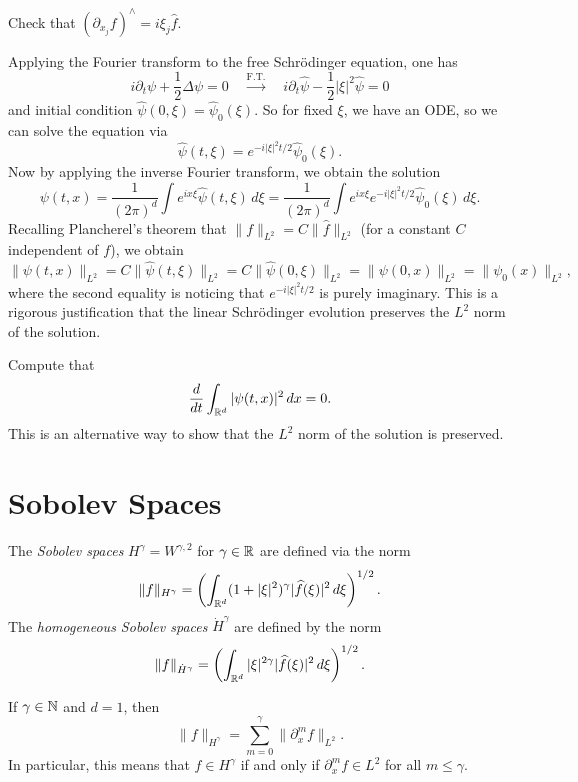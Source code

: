 \begin{exercise}
  Check that $(\partial_{x_j} f)^\wedge = i \xi_j \widehat{f}$.
\end{exercise}

Applying the Fourier transform to the free Schr\"odinger
equation, one has
\[
  i \partial_t \psi + \frac{1}{2} \Delta \psi = 0 \quad
  \xrightarrow{\text{F.T.}} \quad
  i \partial_t \widehat{\psi} - \frac{1}{2} |\xi|^2 \widehat{\psi} = 0
\]
and initial condition $\widehat{\psi}(0, \xi) = \widehat{\psi}_0(\xi)$.
So for fixed $\xi$, we have an ODE, so we
can solve the equation via
\[
  \widehat{\psi}(t, \xi) =
  e^{-i |\xi|^2 t / 2} \widehat{\psi}_0(\xi).
\]
Now by applying the inverse Fourier transform, we obtain
the solution
\[
  \psi(t, x) = \frac{1}{(2\pi)^d} \int e^{ix\xi} \widehat{\psi}(t, \xi)\, d\xi
  = \frac{1}{(2\pi)^d} \int e^{ix\xi} e^{-i |\xi|^2 t / 2} \widehat{\psi}_0(\xi)\, d\xi.
\]
Recalling Plancherel's theorem that
$\|f\|_{L^2} = C\|\widehat{f}\|_{L^2}$ (for a constant
$C$ independent of $f$), we obtain
\[
  \|\psi(t, x)\|_{L^2}
  = C\|\widehat{\psi}(t, \xi)\|_{L^2}
  = C\|\widehat{\psi}(0, \xi)\|_{L^2}
  = \|\psi(0, x)\|_{L^2}
  = \|\psi_0(x)\|_{L^2},
\]
where the second equality is noticing that
$e^{-i |\xi|^2 t / 2}$ is purely imaginary. This is
a rigorous justification that the linear Schr\"odinger
evolution preserves the $L^2$ norm of the solution.

\begin{exercise}
  Compute that
  \[
    \frac{d}{dt} \int_{\mathbb{R}^d} |\psi(t, x)|^2\, dx = 0.
  \]
  This is an alternative way to show that
  the $L^2$ norm of the solution is preserved.
\end{exercise}

\section{Sobolev Spaces}
\begin{definition}
  The \emph{Sobolev spaces} $H^{\gamma} = W^{\gamma, 2}$
  for $\gamma \in \mathbb{R}$
  are defined via the norm
  \[
    \|f\|_{H^{\gamma}}
    = \left(\int_{\mathbb{R}^d} (1 + |\xi|^2)^\gamma |\widehat{f}(\xi)|^2\, d\xi\right)^{1 / 2}.
  \]
  The \emph{homogeneous Sobolev spaces} $\dot{H}^\gamma$
  are defined by the norm
  \[
    \|f\|_{\dot{H}^\gamma}
    = \left(\int_{\mathbb{R}^d} |\xi|^{2\gamma} |\widehat{f}(\xi)|^2\, d\xi\right)^{1 / 2}.
  \]
\end{definition}

\begin{remark}
  If $\gamma \in \mathbb{N}$ and $d = 1$, then
  \[
    \|f\|_{H^{\gamma}}
    = \sum_{m = 0}^\gamma \| \partial_x^m f \|_{L^2}.
  \]
  In particular, this means that
  $f \in H^\gamma$ if and only if
  $\partial_x^m f \in L^2$ for all $m \le \gamma$.
\end{remark}

